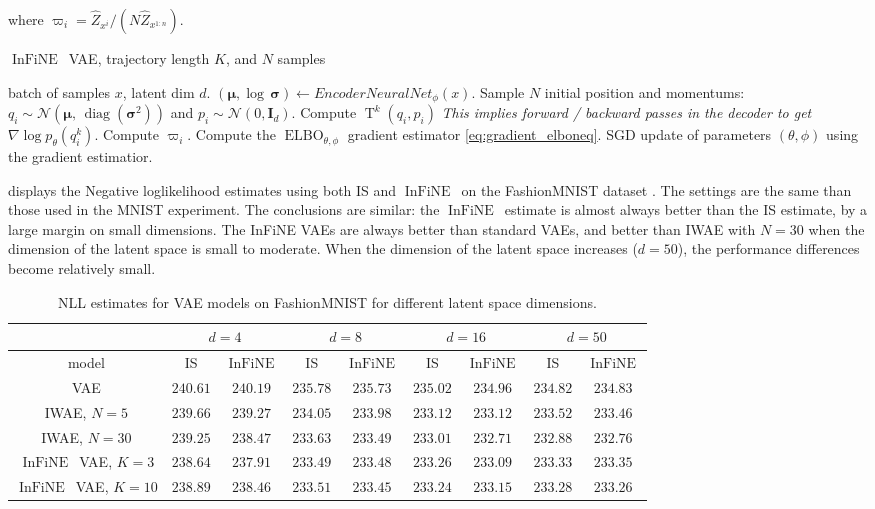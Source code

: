 \documentclass{article}
\def\IFIS{\ensuremath{\operatorname{InFiNE}}}
\def\InFiNE{{\small \IFIS}}
\def\transfo{\operatorname{T}}
\def\ELBO{\operatorname{ELBO}}
\newcommand{\1}{\mathds{1}}
\newcommand{\chunku}[3]{#1^{#2:#3}}
\newcommand{\estConstC}[1]{\widehat{Z}_{#1}}
\begin{document}
where $\varpi_i = \estConstC{x^i}/(N\estConstC{\chunku{x}{1}{n}})$.
\begin{algorithm}[h]
\label{alg:sup:vae}
\caption{\IFIS\ VAE, trajectory length $K$, and $N$ samples}
\begin{algorithmic}
    batch of samples $x$, latent dim $d$.
   \STATE $(\mathbf{\mu}, \log\, \mathbf{\sigma}) \leftarrow EncoderNeuralNet_\phi(x)$.
   \STATE Sample $N$ initial position and momentums: $q_i \sim \mathcal{N}(\mathbf{\mu},\,\operatorname{diag}(\mathbf{\sigma}^{2}))$ and $p_i \sim \mathcal{N}(0, \mathbf{I}_d)$.
   \STATE Compute $\transfo^k(q_i, p_i)$
   \textit{ This implies forward / backward passes in the decoder to get} $\nabla \log p_\theta(q^k_i)$.
   \STATE Compute $\varpi_i$.
   \ENDFOR
   \STATE Compute the $\ELBO_{\theta, \phi}$ gradient estimator \eqref{eq:gradient_elboneq}.
   \STATE SGD update of parameters $(\theta, \phi)$ using the gradient estimatior.
\end{algorithmic}
\end{algorithm}

 displays the Negative loglikelihood estimates using both IS and \IFIS\ on the FashionMNIST dataset \cite{xiao2017fashion}. The settings are the same than those used in the MNIST experiment. The conclusions are similar:  the \IFIS\ estimate is almost always better than the IS estimate, by a large margin on small dimensions. The InFiNE VAEs are always better than standard VAEs, and better than IWAE with $N=30$ when the dimension of the latent space is small to moderate. When the dimension of the latent space increases ($d=50$), the  performance differences become relatively small.
\begin{table}[h]
\centering
\caption{NLL estimates for VAE models on FashionMNIST for different latent space dimensions.}
\label{tab:vae_results}
\begin{tabular}{c|c|c||c|c||c|c||c|c|}
\cline{2-9}
 & \multicolumn{2}{c||}{$d = 4$} & \multicolumn{2}{c||}{$d = 8$} & \multicolumn{2}{c||}{$d = 16$} & \multicolumn{2}{c|}{$d = 50$} \\ \hline
\multicolumn{1}{|c|}{model} & IS & \InFiNE  & IS & \InFiNE& IS  & \InFiNE & IS & \InFiNE \\ \hline
\multicolumn{1}{|c|}{VAE} & $240.61$&$240.19$&$235.78$&$235.73$&$235.02$&$234.96$&$234.82$&$234.83$\\ %
\multicolumn{1}{|c|}{IWAE, $N=5$} & $239.66$&$239.27$&$234.05$&$233.98$&$233.12$&$233.12$&$233.52$&$233.46$ \\ %
\multicolumn{1}{|c|}{IWAE, $N=30$} & $239.25$&$238.47$&$233.63$&$233.49$&$233.01$&$232.71$&$232.88$&$232.76$ \\ \hline
\multicolumn{1}{|c|}{\InFiNE\ VAE, $K=3$} & $238.64$&$237.91$&$233.49$&$233.48$&$233.26$&$233.09$&$233.33$&$233.35$ \\ %
\multicolumn{1}{|c|}{\InFiNE\ VAE, $K=10$} & $238.89$&$238.46$&$233.51$&$233.45$&$233.24$&$233.15$&$233.28$&$233.26$ \\ \hline
\end{tabular}
\end{table}
\end{document}

